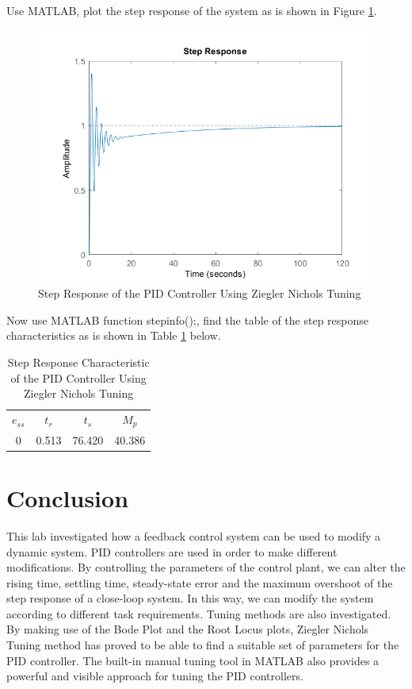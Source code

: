 \documentclass[a4paper, twocolumn, titlepage, 10pt]{article}
\begin{document}
	Use MATLAB, plot the step response of the system as is shown in Figure \ref{Step_PID_ZN}.
	
	\begin{figure}[H]
		\centering
		\includegraphics[width=\linewidth]{Step_PID_ZN}
		\caption{Step Response of the PID Controller Using Ziegler Nichols Tuning}
		\label{Step_PID_ZN}
	\end{figure}
		Now use MATLAB function stepinfo();, find the table of the step response characteristics as is shown in Table \ref{steptable_pid_zn} below. 
		\begin{table}[H]
			\centering
			\begin{tabular}{c c c c}
				$e_{ss}$ & $t_r$ & $t_s$ & $M_p$ \\
				0 & 0.513 & 76.420 & 40.386
			\end{tabular}
			\caption{Step Response Characteristic of the PID Controller Using Ziegler Nichols Tuning}
			\label{steptable_pid_zn}
		\end{table}
	
	\section{Conclusion}
		This lab investigated how a feedback control system can be used to modify a dynamic system. PID controllers are used in order to make different modifications. By controlling the parameters of the control plant, we can alter the rising time, settling time, steady-state error and the maximum overshoot of the step response of a close-loop system. In this way, we can modify the system according to different task requirements. Tuning methods are also investigated. By making use of the Bode Plot and the Root Locus plots, Ziegler Nichols Tuning method has proved to be able to find a suitable set of parameters for the PID controller. The built-in manual tuning tool in MATLAB also provides a powerful and visible approach for tuning the PID controllers.
\end{document}
